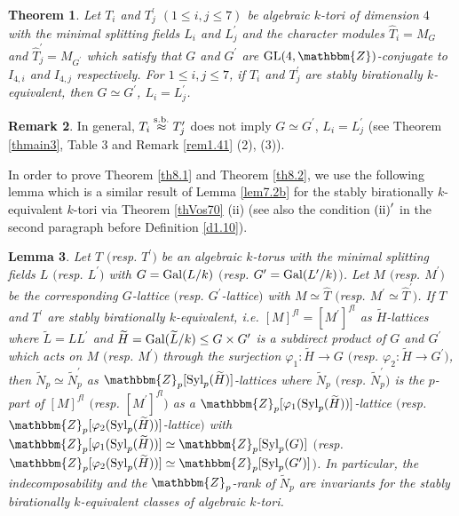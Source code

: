 \documentclass{amsart}
\theoremstyle{plain}
\newtheorem{theorem}{Theorem}[section]
\newtheorem{lemma}[theorem]{Lemma}
\theoremstyle{definition}
\newtheorem{remark}[theorem]{Remark}
\theoremstyle{remark}
\newcommand{\bZ}{\mathbbm{Z}}\newcommand{\bQ}{\mathbbm{Q}}
\newcommand{\GL}{{\rm GL}}\newcommand{\SL}{{\rm SL}}
\newcommand{\Syl}{{\rm Syl}}
\newcounter{sub}\def\tr{\mbox{tr }}
\begin{document}
{\begin{theorem}\label{th8.3}
Let $T_i$ and $T_j^\prime$ $(1\leq i,j\leq 7)$ 
be algebraic $k$-tori of dimension $4$ 
with the minimal splitting fields $L_i$ and $L^\prime_j$ 
and the character modules 
$\widehat{T}_i=M_G$ and $\widehat{T}^\prime_j=M_{G^\prime}$ 
which satisfy that 
$G$ and $G^\prime$ are 
$\GL(4,\bZ)$-conjugate to $I_{4,i}$ and $I_{4,j}$ respectively. 
For $1\leq i,j\leq 7$, 
if $T_i$ and $T_j^\prime$ are stably birationally $k$-equivalent, then 
$G\simeq G^\prime$, $L_i=L_j^\prime$.
\end{theorem}
%
\begin{remark}\label{rem8.4}
In general, $T_i\stackrel{\rm s.b.}{\approx} T_j^\prime$ 
does not imply $G\simeq G^\prime$, $L_i=L_j^\prime$ 
(see Theorem \ref{thmain3}, Table $3$  and Remark \ref{rem1.41} (2), (3)). 
\end{remark}

In order to prove Theorem \ref{th8.1} and Theorem \ref{th8.2}, 
we use the following lemma which is a similar result of Lemma \ref{lem7.2b} 
for the stably birationally $k$-equivalent $k$-tori 
via Theorem \ref{thVos70} (ii) 
(see also the condition ${\rm (ii)}^\prime$ 
in the second paragraph before Definition \ref{d1.10}). 
%
\begin{lemma}\label{lem8.5}
Let $T$ $($resp. $T^\prime$$)$ be an algebraic $k$-torus with 
the minimal splitting fields $L$ $($resp. $L^\prime$$)$ 
with $G={\rm Gal}(L/k)$ $($resp. $G^\prime={\rm Gal}(L^\prime/k)$$)$. 
Let $M$ $($resp. $M^\prime$$)$ be the corresponding $G$-lattice 
$($resp. $G^\prime$-lattice$)$ with $M\simeq \widehat{T}$ 
$($resp. $M^\prime\simeq \widehat{T}^\prime$$)$. 
If $T$ and $T^\prime$ are stably birationally $k$-equivalent, 
i.e. $[M]^{fl}=[M^\prime]^{fl}$ as $\widetilde{H}$-lattices 
where 
$\widetilde{L}=LL^\prime$ and 
$\widetilde{H}={\rm Gal}(\widetilde{L}/k)\leq G\times G^\prime$
is a subdirect product of $G$ and $G^\prime$ 
which acts on $M$ $($resp. $M^\prime)$ 
through the surjection 
$\varphi_1:\widetilde{H}\rightarrow G$ 
$($resp. $\varphi_2:\widetilde{H}\rightarrow G^\prime$$)$, 
then 
$\widetilde{N}_p\simeq \widetilde{N}^\prime_p$ 
as $\bZ_p[\Syl_p(\widetilde{H})]$-lattices 
where $\widetilde{N}_p$ $($resp. $\widetilde{N}^\prime_p$$)$ 
is the $p$-part of $[M]^{fl}$ $($resp. $[M^\prime]^{fl}$$)$ 
as a $\bZ_p[\varphi_1(\Syl_p(\widetilde{H}))]$-lattice 
$($resp. $\bZ_p[\varphi_2(\Syl_p(\widetilde{H}))]$-lattice$)$ 
with $\bZ_p[\varphi_1(\Syl_p(\widetilde{H}))]\simeq \bZ_p[\Syl_p(G)]$ 
$($resp. 
$\bZ_p[\varphi_2(\Syl_p(\widetilde{H}))]\simeq \bZ_p[\Syl_p(G^\prime)]$$)$. 
In particular, the indecomposability and 
the $\bZ_p$-rank of $\widetilde{N}_p$ are invariants for the 
stably birationally $k$-equivalent classes of algebraic $k$-tori. 
\end{lemma}

}
\end{document}
